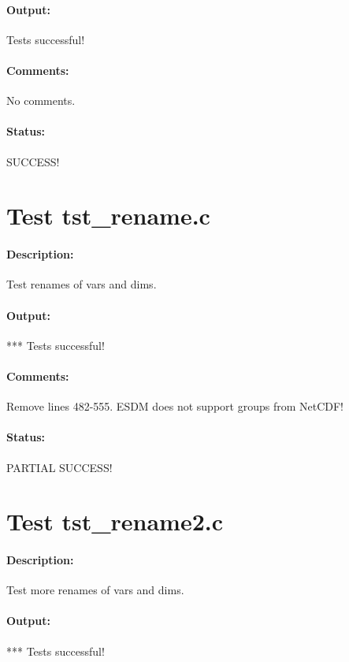 \paragraph{Output:} Tests successful!

\paragraph{Comments:} No comments.

\paragraph{Status:} SUCCESS!

\section{Test tst\_rename.c}

\paragraph{Description:} Test renames of vars and dims.

\paragraph{Output:} *** Tests successful!

\paragraph{Comments:} Remove lines 482-555. ESDM does not support groups from NetCDF!

\paragraph{Status:} PARTIAL SUCCESS!

\section{Test tst\_rename2.c}

\paragraph{Description:} Test more renames of vars and dims.

\paragraph{Output:} *** Tests successful!

